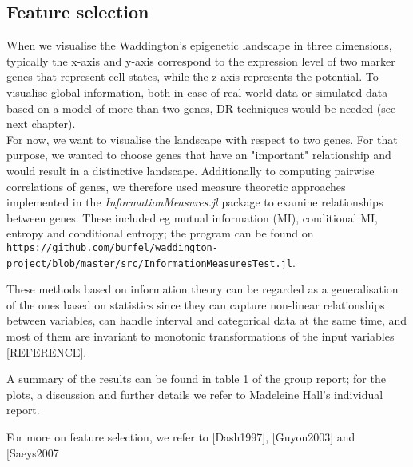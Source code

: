 \documentclass[journal, a4paper]{IEEEtran}
\begin{document}
\subsection{Feature selection}

When we visualise the Waddington's epigenetic landscape in three dimensions, typically the x-axis and y-axis correspond to the expression level of two marker genes that represent cell states, while the z-axis represents the potential. To visualise global information, both in case of real world data or simulated data based on a model of more than two genes, DR techniques would be needed (see next chapter).\\

For now, we want to visualise the landscape with respect to two genes. For that purpose, we wanted to choose genes that have an "important" relationship and would result in a distinctive landscape. 
Additionally to computing pairwise correlations of genes, we therefore used measure theoretic approaches implemented in the \textit{InformationMeasures.jl} package to examine relationships between genes. These included eg mutual information (MI), conditional MI,  entropy and conditional entropy; %
the program can be found on \texttt{https://github.com/burfel/waddington-project/blob/master/src/InformationMeasuresTest.jl}.

These methods based on information theory can be regarded as a generalisation of the ones based on statistics since they can capture non-linear relationships between variables, can handle interval and categorical data at the same time, and most of them are invariant to monotonic transformations of the input variables [REFERENCE].

A summary of the results can be found in table 1 of the group report; for the plots, a discussion and further details we refer to Madeleine Hall's individual report.

For more on feature selection, we refer to [Dash1997], [Guyon2003] and [Saeys2007



\end{document}
